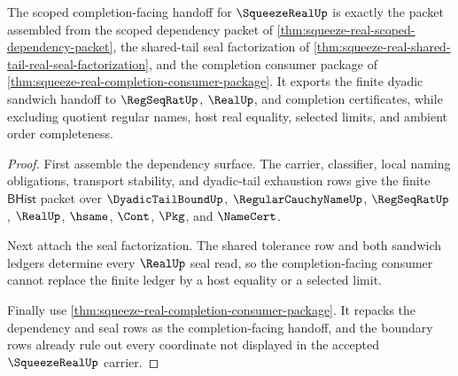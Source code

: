 \begin{theorem}
\label{thm:squeeze-real-completion-handoff-scope}
The scoped completion-facing handoff for $\SqueezeRealUp$ is exactly the packet assembled from the scoped dependency packet of \autoref{thm:squeeze-real-scoped-dependency-packet}, the shared-tail seal factorization of \autoref{thm:squeeze-real-shared-tail-real-seal-factorization}, and the completion consumer package of \autoref{thm:squeeze-real-completion-consumer-package}. It exports the finite dyadic sandwich handoff to $\RegSeqRatUp$, $\RealUp$, and completion certificates, while excluding quotient regular names, host real equality, selected limits, and ambient order completeness.
\end{theorem}
\begin{proof}
First assemble the dependency surface. The carrier, classifier, local naming obligations, transport stability, and dyadic-tail exhaustion rows give the finite $\mathsf{BHist}$ packet over $\DyadicTailBoundUp$, $\RegularCauchyNameUp$, $\RegSeqRatUp$, $\RealUp$, $\hsame$, $\Cont$, $\Pkg$, and $\NameCert$.

Next attach the seal factorization. The shared tolerance row and both sandwich ledgers determine every $\RealUp$ seal read, so the completion-facing consumer cannot replace the finite ledger by a host equality or a selected limit.

Finally use \autoref{thm:squeeze-real-completion-consumer-package}. It repacks the dependency and seal rows as the completion-facing handoff, and the boundary rows already rule out every coordinate not displayed in the accepted $\SqueezeRealUp$ carrier.
\end{proof}

